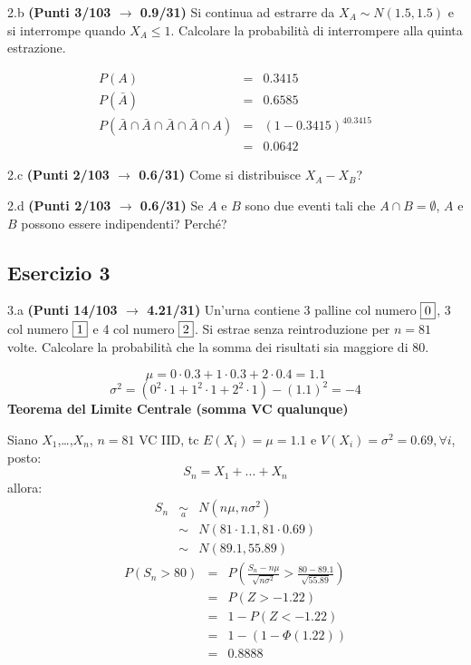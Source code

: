 \documentclass[
  11pt,
]{book}
\theoremstyle{mytheoremstyle}
\theoremstyle{mydefstyle}
\newenvironment{sol}
  {
  \begin{tcolorbox}[enhanced,breakable,arc=0.1mm,boxrule=1pt,colback=white,colframe=iblue,
  title=\bf \fontfamily{lmss}\selectfont \hspace{.5 cm} Soluzione,drop fuzzy shadow]

}{
\end{tcolorbox}
  }
\begin{document}
2.b \textbf{(Punti 3/103 \(\rightarrow\) 0.9/31)} Si continua ad estrarre da \(X_A\sim N(1.5,1.5)\) e si interrompe quando \(X_A\le 1\). Calcolare la probabilità di interrompere alla quinta estrazione.

\begin{sol}
\begin{eqnarray*}
  P(A) &=&  0.3415\\
  P(\bar A) &=& 0.6585\\
  P(\bar A\cap \bar A\cap\bar A\cap\bar A\cap A)&=& (1-0.3415)^40.3415\\
  &=& 0.0642
\end{eqnarray*}

\end{sol}

2.c \textbf{(Punti 2/103 \(\rightarrow\) 0.6/31)} Come si distribuisce \(X_A-X_B\)?

2.d \textbf{(Punti 2/103 \(\rightarrow\) 0.6/31)} Se \(A\) e \(B\) sono due eventi tali che \(A\cap B=\emptyset\), \(A\) e \(B\) possono essere indipendenti? Perché?

\subsection{Esercizio 3}\label{esercizio-3-26}

3.a \textbf{(Punti 14/103 \(\rightarrow\) 4.21/31)} Un'urna contiene 3 palline col numero \(\fbox{0}\), 3 col numero \(\fbox{1}\) e 4 col numero \(\fbox{2}\). Si estrae senza reintroduzione per \(n=81\) volte.
Calcolare la probabilità che la somma dei risultati sia maggiore di 80.

\begin{sol}
\[ \mu = 0 \cdot 0.3+1 \cdot 0.3+2 \cdot 0.4 = 1.1 \]\[ \sigma^2 =( 0^2 \cdot 1+1^2 \cdot 1+2^2 \cdot 1 )-( 1.1 )^2= -4 \]\textbf{Teorema del Limite Centrale (somma VC qualunque)}

Siano \(X_1\),\ldots,\(X_n\), \(n=81\) VC IID, tc \(E(X_i)=\mu=1.1\) e \(V(X_i)=\sigma^2=0.69,\forall i\), posto:
\[
      S_n = X_1 + ... + X_n
      \]
allora:\begin{eqnarray*}
  S_n & \mathop{\sim}\limits_{a}& N(n\mu,n\sigma^2) \\
     &\sim & N(81\cdot1.1,81\cdot0.69) \\
     &\sim & N(89.1,55.89) 
  \end{eqnarray*}\begin{eqnarray*}
      P( S_n   >   80 ) 
        &=& P\left(  \frac { S_n  -  n\mu }{ \sqrt{n\sigma^2} }  >  \frac { 80  -  89.1 }{\sqrt{ 55.89 }} \right)  \\
                 &=& P\left(  Z   >   -1.22 \right) \\    &=& 1-P(Z< -1.22 )\\ 
                 &=&  1-(1-\Phi( 1.22 )) \\ &=&  0.8888 
      \end{eqnarray*}

\end{sol}
\end{document}
